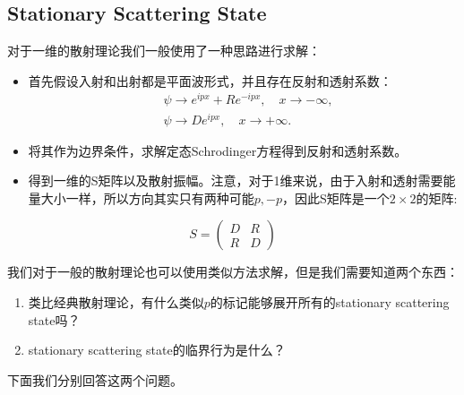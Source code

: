 \subsection{Stationary Scattering State}

\bigskip
{}

对于一维的散射理论我们一般使用了一种思路进行求解：
\begin{itemize}
  \item 首先假设入射和出射都是平面波形式，并且存在反射和透射系数：
    \begin{align}
      &\psi\to e^{ipx}+Re^{-ipx},\quad
      x\to-\infty,\\
      &\psi\to De^{ipx},\quad x\to+\infty.
    \end{align}
  \item 将其作为边界条件，求解定态Schrodinger方程得到反射和透射系数。
  \item 得到一维的S矩阵以及散射振幅。注意，对于1维来说，由于入射和透射需要能量大小一样，所以方向其实只有两种可能$ p,-p
    $，因此S矩阵是一个$ 2\times2 $的矩阵:
\end{itemize}
\[
  S = {
    \begin{pmatrix}
      D & R\\
      R & D
  \end{pmatrix}}
\]

\bigskip
{}

我们对于一般的散射理论也可以使用类似方法求解，但是我们需要知道两个东西：
\begin{enumerate}
  \item 类比经典散射理论，有什么类似$ p $的标记能够展开所有的stationary scattering state吗？
  \item stationary scattering state的临界行为是什么？
\end{enumerate}

下面我们分别回答这两个问题。

\bigskip
{}

